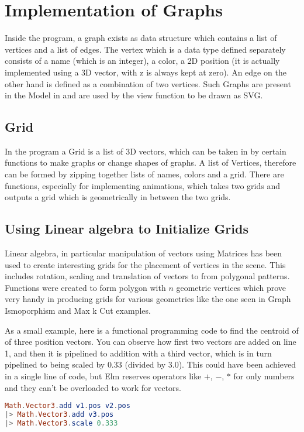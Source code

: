 \section{Implementation of Graphs}
Inside the program, a graph exists as data structure which contains a list of
vertices and a list of edges. The vertex which is a data type defined
separately consists of a name (which is an integer), a color, a 2D position (it
is actually implemented using a 3D vector, with z is always kept at zero).  An
edge on the other hand is defined as a combination of two vertices. Such Graphs
are present in the Model in and are used by the view function to be drawn as
SVG.

\subsection{Grid}
In the program a Grid is a list of 3D vectors, which can be taken in by certain
functions to make graphs or change shapes of graphs.  A list of Vertices,
therefore can be formed by zipping together lists of names, colors and a grid.
There are functions, especially for implementing animations, which takes two
grids and outputs a grid which is geometrically in between the two grids.

\subsection{Using Linear algebra to Initialize Grids}
Linear algebra, in particular manipulation of vectors using Matrices has been
used to create interesting grids for the placement of vertices in the scene.
This includes rotation, scaling and translation of vectors to from polygonal
patterns. Functions were created to form polygon with $n$ geometric vertices
which prove very handy in producing grids for various geometries like
the one seen in Graph Ismoporphism and Max k Cut examples.

As a small example, here is a functional programming code to find the centroid
of of three position vectors. You can observe how first two vectors are added
on line 1, and then it is pipelined to addition with a third vector, which is
in turn pipelined to being scaled by $0.33$ (divided by $3.0$). This could have
been achieved in a single line of code, but Elm reserves operators like $+$,
$-$, $*$ for only numbers and they can't be overloaded to work for vectors.

\begin{lstlisting}[language=elm]
Math.Vector3.add v1.pos v2.pos
|> Math.Vector3.add v3.pos
|> Math.Vector3.scale 0.333
\end{lstlisting}

